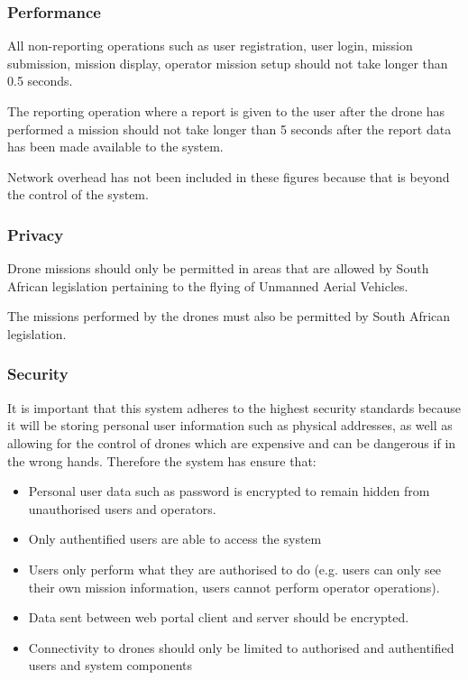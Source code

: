 \documentclass{article}
\begin{document}
	\subsubsection{Performance}
	All non-reporting operations such as user registration, user login, mission submission, mission display, operator mission setup should not take longer than 0.5 seconds.
	
	The reporting operation where a report is given to the user after the drone has performed a mission should not take longer than 5 seconds after the report data has been made available to the system.
	
	Network overhead has not been included in these figures because that is beyond the control of the system.
	
	\subsubsection{Privacy}
	Drone missions should only be permitted in areas that are allowed by South African legislation pertaining to the flying of Unmanned Aerial Vehicles.
	
	The missions performed by the drones must also be permitted by South African legislation.
	
	\subsubsection{Security}
	It is important that this system adheres to the highest security standards because it will be storing personal user information such as physical addresses, as well as allowing for the control of drones which are expensive and can be dangerous if in the wrong hands. Therefore the system has ensure that:
	\begin{itemize}
		\item Personal user data such as password is encrypted to remain hidden from unauthorised users and operators.
		\item Only authentified users are able to access the system
		\item Users only perform what they are authorised to do (e.g. users can only see their own mission information, users cannot perform operator operations).
		\item Data sent between web portal client and server should be encrypted.
		\item Connectivity to drones should only be limited to authorised and authentified users and system components
	\end{itemize}
	
\end{document}
